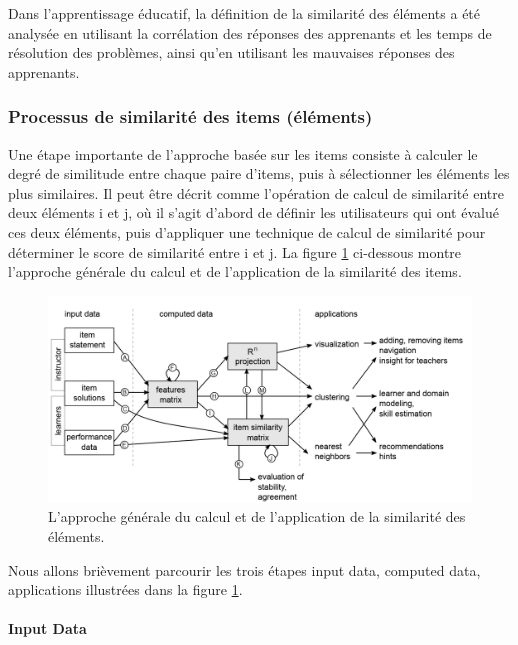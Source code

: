 Dans l'apprentissage éducatif, la définition de la similarité des éléments a été analysée en utilisant la corrélation des réponses des apprenants et les temps de résolution des problèmes, ainsi qu'en utilisant les mauvaises réponses des apprenants. \cite{pelanek2018measuring}

\subsubsection{Processus de similarité des items (éléments)}
Une étape importante de l'approche basée sur les items consiste à calculer le degré de similitude entre chaque paire d’items, puis à sélectionner les éléments les plus similaires. Il peut être décrit comme l'opération de calcul de similarité entre deux éléments i et j, où il s'agit d'abord de définir les utilisateurs qui ont évalué ces deux éléments, puis d'appliquer une technique de calcul de similarité pour déterminer le score de similarité entre i et j. \cite{item_based_recommendation_algo} La figure \ref{calcul_application_similarity} ci-dessous montre l'approche générale du calcul et de l'application de la similarité des items.

\begin{figure}[H]
	\begin{center}
		\includegraphics[width=\textwidth]{images/chapitre3/calcul_application_similarity.png}
	\end{center}
\caption{L'approche générale du calcul et de l'application de la similarité des éléments.}
\label{calcul_application_similarity}
\end{figure}

Nous allons brièvement parcourir les trois étapes input data, computed data, applications illustrées dans la figure \ref{calcul_application_similarity}. 
\paragraph{Input Data}


